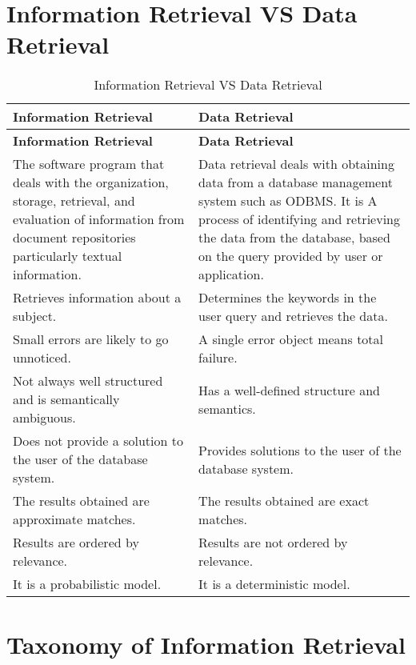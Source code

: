 \section{Information Retrieval VS Data Retrieval \cite{gfg-what-is-ir}}
\begin{longtable}[H]{|p{7.5cm}|p{7.5cm}|}
    \caption{Information Retrieval VS Data Retrieval}\\
    \hline

    \textbf{Information Retrieval} & \textbf{Data Retrieval}  \\
    \hline
    \endfirsthead

    \textbf{Information Retrieval} & \textbf{Data Retrieval}  \\
    \hline\endhead
    \hline\endfoot
    \hline\endlastfoot
     
     \hline
     The software program that deals with the organization, storage, retrieval, and evaluation of information from document repositories particularly textual information.  & Data retrieval deals with obtaining data from a database management system such as ODBMS. It is A process of identifying and retrieving the data from the database, based on the query provided by user or application. \\
     \hline
     Retrieves information about a subject. & Determines the keywords in the user query and retrieves the data. \\
     \hline
     Small errors are likely to go unnoticed. & A single error object means total failure. \\
     \hline
     Not always well structured and is semantically ambiguous. & Has a well-defined structure and semantics. \\
     \hline
     Does not provide a solution to the user of the database system. & Provides solutions to the user of the database system. \\
     \hline
     The results obtained are approximate matches. & The results obtained are exact matches. \\
     \hline
     Results are ordered by relevance. & Results are not ordered by relevance.\\
     \hline
     It is a probabilistic model. & It is a deterministic model.\\
     \hline
\end{longtable}


\section{Taxonomy of Information Retrieval \cite{researchgate/47397195_A_Taxonomy_of_Information_Retrieval_Models_and_Tools}}

